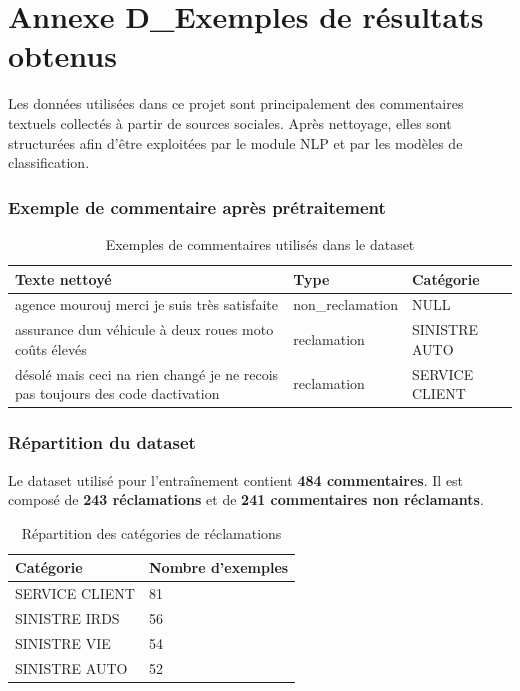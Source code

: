 \documentclass[12pt,a4paper,oneside]{report}
\begin{document}
\chapter*{Annexe D\_Exemples de résultats obtenus}

\setcounter{subsection}{0}
\renewcommand{\thesubsection}{D.\arabic{subsection}}

Les données utilisées dans ce projet sont principalement des commentaires textuels collectés à partir de sources sociales. Après nettoyage, elles sont structurées afin d'être exploitées par le module NLP et par les modèles de classification.

\subsection{Exemple de commentaire après prétraitement}

\begin{table}[H]
\centering
\small
\caption{Exemples de commentaires utilisés dans le dataset}
\label{tab:annexe_exemples_donnees}
\begin{tabular}{|p{7cm}|p{3cm}|p{3cm}|}
\hline
\textbf{Texte nettoyé} & \textbf{Type} & \textbf{Catégorie} \\
\hline
agence mourouj merci je suis très satisfaite & non\_reclamation & NULL \\
\hline
assurance dun véhicule à deux roues moto coûts élevés & reclamation & SINISTRE AUTO \\
\hline
désolé mais ceci na rien changé je ne recois pas toujours des code dactivation & reclamation & SERVICE CLIENT \\
\hline
\end{tabular}
\end{table}

\subsection{Répartition du dataset}

Le dataset utilisé pour l'entraînement contient \textbf{484 commentaires}. Il est composé de \textbf{243 réclamations} et de \textbf{241 commentaires non réclamants}.

\begin{table}[H]
\centering
\small
\caption{Répartition des catégories de réclamations}
\label{tab:annexe_repartition_categories}
\begin{tabular}{|p{6cm}|p{4cm}|}
\hline
\textbf{Catégorie} & \textbf{Nombre d'exemples} \\
\hline
SERVICE CLIENT & 81 \\
\hline
SINISTRE IRDS & 56 \\
\hline
SINISTRE VIE & 54 \\
\hline
SINISTRE AUTO & 52 \\
\hline
\end{tabular}
\end{table}
\end{document}
